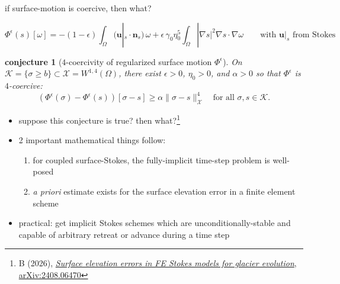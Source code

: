 \documentclass[aspectratio=169,10pt]{beamer}
\newtheorem{conjecture}[theorem]{conjecture}
\newcommand{\bn}{\mathbf{n}}
\newcommand{\bu}{\mathbf{u}}
\newcommand{\cK}{{\mathcal{K}}}
\newcommand{\cX}{{\mathcal{X}}}
\newcommand{\eps}{\epsilon}
\newcommand{\grad}{\nabla}
\begin{document}
\begin{frame}{if surface-motion is coercive, then what?}

{\small
$$\Phi^\eps(s)[\omega] = -(1-\eps)\int_\Omega (\bu|_s \cdot \bn_s)\, \omega +\eps\,\gamma_0\eta_0^{5}\int_\Omega|\grad s|^{2}\grad s\cdot\grad\omega \qquad \text{with $\bu|_s$ from Stokes}$$

\begin{conjecture}[$4$-coercivity of regularized surface motion $\Phi^\eps$]
On $\cK = \{\sigma \ge b\} \subset \cX=W^{1,4}(\Omega)$, there exist $\eps>0$, $\eta_0>0$, and $\alpha>0$ so that $\Phi^\eps$ is $4$-coercive:
    $$\left(\Phi^\eps(\sigma)-\Phi^\eps(s)\right)[\sigma-s]\ge\alpha\|\sigma-s\|_\cX^4 \quad \text{for all } \sigma,s\in\cK.$$
\end{conjecture}
}

\smallskip
\begin{itemize}
\item suppose this conjecture is true?  then what?\footnote{B (2026), \href{https://arxiv.org/abs/2408.06470}{\emph{Surface elevation errors in FE Stokes models for glacier evolution}, arXiv:2408.06470}}

\pause
\smallskip
\item 2 important mathematical things follow:
   \begin{enumerate}
   \item for coupled surface-Stokes, the fully-implicit time-step problem is well-posed
   \item \emph{a priori} estimate exists for the surface elevation error in a finite element scheme
   \end{enumerate}
\item practical: get implicit Stokes schemes which are unconditionally-stable and capable of arbitrary retreat or advance during a time step
\end{itemize}
\end{frame}
\end{document}
